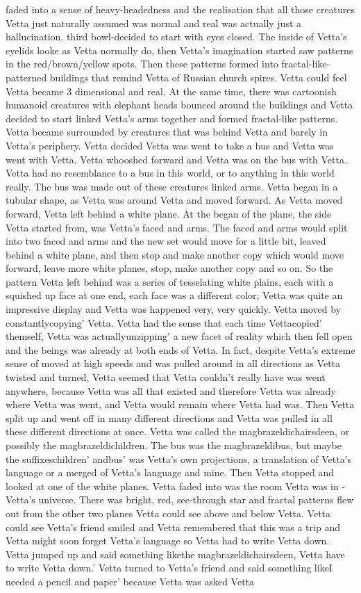 \documentclass[12pt]{book}
\begin{document}
faded into a sense of heavy-headedness and the realisation that all those creatures Vetta just naturally assumed was normal and real was actually just a hallucination. third bowl-decided to start with eyes closed. The inside of Vetta's eyelids looke as Vetta normally do, then Vetta's imagination started saw patterns in the red/brown/yellow spots. Then these patterns formed into fractal-like-patterned buildings that remind Vetta of Russian church spires. Vetta could feel Vetta became 3 dimensional and real. At the same time, there was cartoonish humanoid creatures with elephant heads bounced around the buildings and Vetta decided to start linked Vetta's arms together and formed fractal-like patterns. Vetta became surrounded by creatures that was behind Vetta and barely in Vetta's periphery. Vetta decided Vetta was went to take a bus and Vetta was went with Vetta. Vetta whooshed forward and Vetta was on the bus with Vetta. Vetta had no resemblance to a bus in this world, or to anything in this world really. The bus was made out of these creatures linked arms. Vetta began in a tubular shape, as Vetta was around Vetta and moved forward. As Vetta moved forward, Vetta left behind a white plane. At the began of the plane, the side Vetta started from, was Vetta's faced and arms. The faced and arms would split into two faced and arms and the new set would move for a little bit, leaved behind a white plane, and then stop and make another copy which would move forward, leave more white planes, stop, make another copy and so on. So the pattern Vetta left behind was a series of tesselating white plains, each with a squished up face at one end, each face was a different color; Vetta was quite an impressive display and Vetta was happened very, very quickly. Vetta moved by constantlycopying' Vetta. Vetta had the sense that each time Vettacopied' themself, Vetta was actuallyunzipping' a new facet of reality which then fell open and the beings was already at both ends of Vetta. In fact, despite Vetta's extreme sense of moved at high speeds and was pulled around in all directions as Vetta twisted and turned, Vetta seemed that Vetta couldn't really have was went anywhere, because Vetta was all that existed and therefore Vetta was already where Vetta was went, and Vetta would remain where Vetta had was. Then Vetta split up and went off in many different directions and Vetta was pulled in all these different directions at once. Vetta was called the magbrazeldichairsdeen, or possibly the magbrazeldichildren. The bus was the magbrazeldibus, but maybe the suffixeschildren' andbus' was Vetta's own projections, a translation of Vetta's language or a merged of Vetta's language and mine. Then Vetta stopped and looked at one of the white planes. Vetta faded into was the room Vetta was in - Vetta's universe. There was bright, red, see-through star and fractal patterns flew out from the other two planes Vetta could see above and below Vetta. Vetta could see Vetta's friend smiled and Vetta remembered that this was a trip and Vetta might soon forget Vetta's language so Vetta had to write Vetta down. Vetta jumped up and said something likethe magbrazeldichairsdeen, Vetta have to write Vetta down.' Vetta turned to Vetta's friend and said something likeI needed a pencil and paper' because Vetta was asked Vetta 
\end{document}
